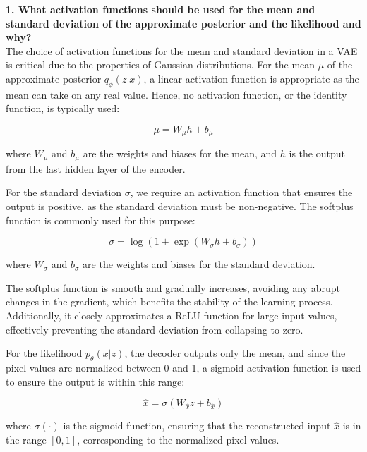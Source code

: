 \textbf{1. What activation functions should be used for the mean and standard deviation of the approximate posterior and the likelihood and why?} \\

The choice of activation functions for the mean and standard deviation in a VAE is critical due to the properties of Gaussian distributions. For the mean \(\mu\) of the approximate posterior \(q_\phi(z | x)\), a linear activation function is appropriate as the mean can take on any real value. Hence, no activation function, or the identity function, is typically used:

\begin{equation}
\mu = W_{\mu}h + b_{\mu}
\end{equation}

where \(W_{\mu}\) and \(b_{\mu}\) are the weights and biases for the mean, and \(h\) is the output from the last hidden layer of the encoder.

For the standard deviation \(\sigma\), we require an activation function that ensures the output is positive, as the standard deviation must be non-negative. The softplus function is commonly used for this purpose:

\begin{equation}
\sigma = \log(1 + \exp(W_{\sigma}h + b_{\sigma}))
\end{equation}

where \(W_{\sigma}\) and \(b_{\sigma}\) are the weights and biases for the standard deviation.

The softplus function is smooth and gradually increases, avoiding any abrupt changes in the gradient, which benefits the stability of the learning process. Additionally, it closely approximates a ReLU function for large input values, effectively preventing the standard deviation from collapsing to zero.

For the likelihood \(p_\theta(x | z)\), the decoder outputs only the mean, and since the pixel values are normalized between 0 and 1, a sigmoid activation function is used to ensure the output is within this range:

\begin{equation}
\hat{x} = \sigma(W_{\hat{x}}z + b_{\hat{x}})
\end{equation}

where \(\sigma(\cdot)\) is the sigmoid function, ensuring that the reconstructed input \(\hat{x}\) is in the range \([0, 1]\), corresponding to the normalized pixel values.\\


